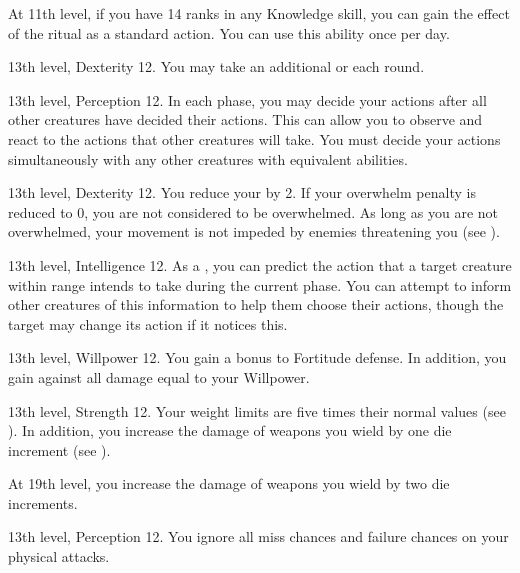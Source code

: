     At 11th level, if you have 14 ranks in any Knowledge skill, you can gain the effect of the  ritual as a standard action.
    You can use this ability once per day.

    \featpre 13th level, Dexterity 12.
    \featben You may take an additional  or  each round.

    \featpre 13th level, Perception 12.
    \featben In each phase, you may decide your actions after all other creatures have decided their actions.
    This can allow you to observe and react to the actions that other creatures will take.
    You must decide your actions simultaneously with any other creatures with equivalent abilities.

    \featpre 13th level, Dexterity 12.
    \featben You reduce your  by 2.
    If your overwhelm penalty is reduced to 0, you are not considered to be overwhelmed.
    As long as you are not overwhelmed, your movement is not impeded by enemies threatening you (see ).

    \featpre 13th level, Intelligence 12.
    \featben As a , you can predict the action that a target creature within \rngmed range intends to take during the current phase.
    You can attempt to inform other creatures of this information to help them choose their actions, though the target may change its action if it notices this.

    \featpre 13th level, Willpower 12.
    \featben You gain a  bonus to Fortitude defense.
    In addition, you gain  against all damage equal to your Willpower.

    \featpre 13th level, Strength 12.
    \featben Your weight limits are five times their normal values (see ).
    In addition, you increase the damage of weapons you wield by one die increment (see ).

    At 19th level, you increase the damage of weapons you wield by two die increments.

    \featpre 13th level, Perception 12.
    \featben You ignore all miss chances and failure chances on your physical attacks.

